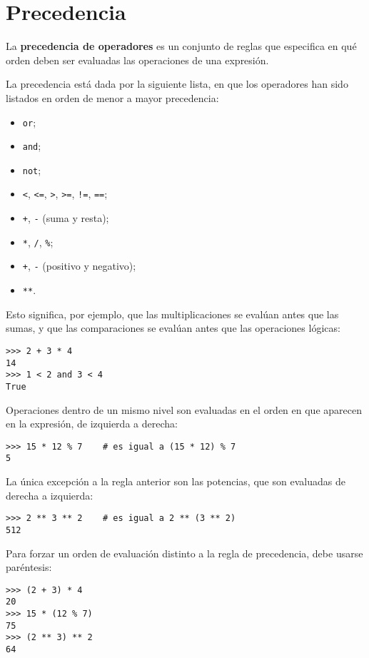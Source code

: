 \section{Precedencia}

La \textbf{precedencia de operadores} es un conjunto de reglas que
especifica en qué orden deben ser evaluadas las operaciones de una
expresión.

La precedencia está dada por la siguiente lista, en que los operadores
han sido listados en orden de menor a mayor precedencia:

\begin{itemize}
\item
  \lstinline!or!;
\item
  \lstinline!and!;
\item
  \lstinline!not!;
\item
  \lstinline!<!, \lstinline!<=!, \lstinline!>!, \lstinline!>=!,
  \lstinline"!=", \lstinline!==!;
\item
  \lstinline!+!, \lstinline!-! (suma y resta);
\item
  \lstinline!*!, \lstinline!/!, \lstinline!%!;
\item
  \lstinline!+!, \lstinline!-! (positivo y negativo);
\item
  \lstinline!**!.
\end{itemize}

Esto significa, por ejemplo, que las multiplicaciones se evalúan antes
que las sumas, y que las comparaciones se evalúan antes que las
operaciones lógicas:
\begin{lstlisting}
>>> 2 + 3 * 4
14
>>> 1 < 2 and 3 < 4
True
\end{lstlisting}
Operaciones dentro de un mismo nivel son evaluadas en el orden en que
aparecen en la expresión, de izquierda a derecha:
\begin{lstlisting}
>>> 15 * 12 % 7    # es igual a (15 * 12) % 7
5
\end{lstlisting}
La única excepción a la regla anterior son las potencias, que son
evaluadas de derecha a izquierda:
\begin{lstlisting}
>>> 2 ** 3 ** 2    # es igual a 2 ** (3 ** 2)
512
\end{lstlisting}

Para forzar un orden de evaluación distinto a la regla de precedencia,
debe usarse paréntesis:
\begin{lstlisting}
>>> (2 + 3) * 4
20
>>> 15 * (12 % 7)
75
>>> (2 ** 3) ** 2
64
\end{lstlisting}

